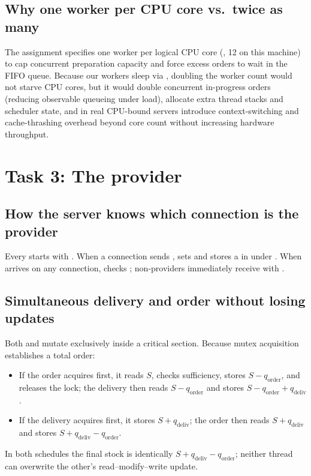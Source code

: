 \documentclass{../latex/utmreport}
\begin{document}
\subsection{Why one worker per CPU core vs.\ twice as many}
The assignment specifies one worker per logical CPU core (, 12 on this machine) to cap concurrent preparation capacity and force excess orders to wait in the FIFO queue. Because our workers sleep via \allowbreak{}, doubling the worker count would not starve CPU cores, but it would double concurrent in-progress orders (reducing observable queueing under load), allocate extra thread stacks and scheduler state, and in real CPU-bound servers introduce context-switching and cache-thrashing overhead beyond core count without increasing hardware throughput.

\section{Task 3: The provider}
\subsection{How the server knows which connection is the provider}
Every  starts with . When a connection sends ,  sets  and stores a \allowbreak{} in  under . When  arrives on any connection,  checks ; non-providers immediately receive  with \allowbreak{}.

\subsection{Simultaneous delivery and order without losing updates}
Both  and  mutate  exclusively inside a \allowbreak{} critical section. Because mutex acquisition establishes a total order:
\begin{itemize}
  \item If the order acquires  first, it reads $S$, checks sufficiency, stores $S - q_{\text{order}}$, and releases the lock; the delivery then reads $S - q_{\text{order}}$ and stores $S - q_{\text{order}} + q_{\text{deliv}}$.
  \item If the delivery acquires  first, it stores $S + q_{\text{deliv}}$; the order then reads $S + q_{\text{deliv}}$ and stores $S + q_{\text{deliv}} - q_{\text{order}}$.
\end{itemize}
In both schedules the final stock is identically $S + q_{\text{deliv}} - q_{\text{order}}$; neither thread can overwrite the other's read--modify--write update.
\end{document}
